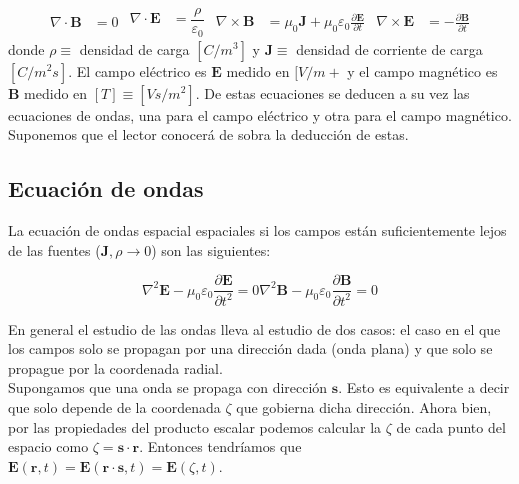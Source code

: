 \documentclass[12pt]{article}
\newcommand{\parciales}[2]{\frac{\partial #1}{\partial #2}}
\newcommand{\rota}{\nabla \times}
\newcommand{\dive}{\nabla \cdot}
\newcommand{\Bn}{\mathbf{B}}
\newcommand{\En}{\mathbf{E}}
\newcommand{\Jn}{\mathbf{J}}
\newcommand{\rn}{\mathbf{r}}
\newcommand{\sn}{\mathbf{s}}
\numberwithin{equation}{section}
\numberwithin{figure}{section}
\begin{document}
\begin{subequations}\label{Ec:4.1.Maxwell}
\begin{align}
\dive \Bn & = 0 \label{Ec:4.1.a.DivB}
\end{align}
\begin{align}
\dive \En & = \dfrac{\rho}{\varepsilon_0} \label{Ec:4.1.b.DivE}
\end{align}
\begin{align}
\rota \Bn  & = \mu_0 \Jn + \mu_0 \varepsilon_0 \parciales{\En}{t} \label{Ec:4.1.c.RotB}
\end{align}
\begin{align}
\rota \En  & = -  \parciales{\Bn}{t} \label{Ec:4.1.d.RotE}
\end{align}
\end{subequations}
donde $\rho \equiv$ densidad de carga $[C/m^3]$ y $\Jn \equiv$ densidad de corriente de carga $[C/m^2 s]$. El campo eléctrico es $\En$ medido en $[V/m+$ y el campo magnético es $\Bn$ medido en $[T] \equiv [V s/ m^2]$. De estas ecuaciones se deducen a su vez las ecuaciones de ondas, una para el campo eléctrico y otra para el campo magnético. Suponemos que el lector conocerá de sobra la deducción de estas.


\subsection{Ecuación de ondas}

La ecuación de ondas espacial espaciales si los campos están suficientemente lejos de las fuentes ($\Jn,\rho \rightarrow 0$) son las siguientes:


\begin{subequations}
\begin{equation}
\nabla^2 \En - \mu_0 \varepsilon_0 \parciales{\En}{t^2} = 0 \label{Ec:4.2.a.Ondas}
\end{equation}
\begin{equation}
\nabla^2 \Bn - \mu_0 \varepsilon_0 \parciales{\Bn}{t^2} = 0 \label{Ec:4.2.b.Ondas}
\end{equation}
\end{subequations}  


En general el estudio de las ondas lleva al estudio de dos casos: el caso en el que los campos solo se propagan por una dirección dada (onda plana) y que solo se propague por la coordenada radial. \\

Supongamos que una onda se propaga con dirección $\sn$. Esto es equivalente a decir que solo depende de la coordenada $\zeta$ que gobierna dicha dirección. Ahora bien, por las propiedades del producto escalar podemos calcular la $\zeta$ de cada punto del espacio como $\zeta = \sn \cdot \rn$. Entonces tendríamos que $\En (\rn,t) = \En ( \rn \cdot \sn, t) = \En (\zeta, t)$. \\
\end{document}
